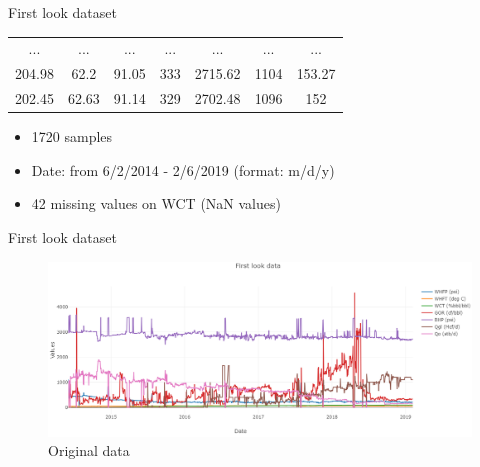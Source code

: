 \documentclass[xcolor=table, 11pt]{beamer}
\begin{document}
\begin{frame}{First look dataset}
\begin{table}[h]
\begin{tabular}{@{}ccccccc@{}}
    ...                                                         & ...                                                           & ...                                                              & ...                                                           & ...                                                        & ...                                                          & ...                                                         \\
    204.98                                                      & 62.2                                                          & 91.05                                                            & 333                                                           & 2715.62                                                    & 1104                                                         & 153.27                                                      \\
    202.45                                                      & 62.63                                                         & 91.14                                                            & 329                                                           & 2702.48                                                    & 1096                                                         & 152                                                         \\ \bottomrule
    \end{tabular}
    \end{table}
    \begin{itemize}
        \item 1720 samples
        \item Date: from 6/2/2014 - 2/6/2019 (format: m/d/y)
        \item 42 missing values on WCT (NaN values)
    \end{itemize}
\end{frame}

\begin{frame}{First look dataset}
    \begin{figure}
        \centering
        \includegraphics[scale=.38]{fig/first_look.PNG}
        \caption{Original data}
        \label{fig:my_label}
    \end{figure}
\end{frame}
\end{document}
